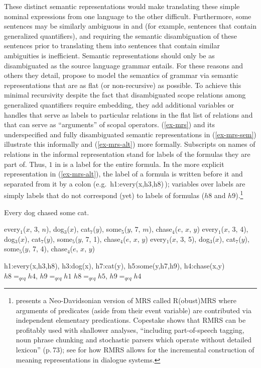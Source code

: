 \documentclass[output=paper
	        ,collection
	        ,collectionchapter
 	        ,biblatex
                ,babelshorthands
                ,newtxmath
                ,draftmode
                ,colorlinks, citecolor=brown
]{langscibook}
\begin{document}
These distinct semantic representations would make translating these simple nominal expressions from one language to the other difficult. Furthermore, some sentences may be similarly ambiguous in  and  (for example, sentences that contain generalized quantifiers), and requiring the semantic disambiguation of these sentences prior to translating them into sentences that contain similar ambiguities is inefficient. Semantic representations should only be as disambiguated as the source language grammar entails. For these reasons and others they detail, \citet{Copestakeetal1995} propose to model the semantics of grammar via semantic representations that are as flat (or non-recursive) as possible. To achieve this minimal recursivity despite the fact that disambiguated scope relations among generalized quantifiers require embedding, they add additional variables or handles that serve as labels to particular relations in the flat list of relations and that can serve as ``arguments'' of scopal operators. (\ref{ex-mrs}) and its underspecified and fully disambiguated semantic representations in (\ref{ex-mrs-sem}) illustrate this informally and (\ref{ex-mrs-alt}) more formally. Subscripts on names of relations in the informal representation stand for labels of the formulas they are part of. Thus, $1$ in  is a label for the entire formula. In the more explicit representation in (\ref{ex-mrs-alt}), the label of a formula is written before it and separated from it by a colon (e.g.\ h1:every(x,h3,h8)\,); 
variables over labels are simply labels that do not correspond (yet) to labels of formulas ($h8$ and $h9$).\footnote{\citet{Copestake2007} presents a Neo-Davidsonian version of MRS called R(obust)MRS where arguments of predicates (aside from their event variable) are contributed via independent elementary predications. Copestake shows that RMRS can be profitably used with shallower analyses, ``including part-of-speech tagging, noun phrase chunking and stochastic parsers which operate without detailed lexicon'' (p.\,73); see \citet{PeldzusandSchlangen2012} for how RMRS allows for the incremental construction of meaning representations in dialogue systems.}

\begin{exe}
\ex\label{ex-mrs}
Every dog chased some cat.
\ex\label{ex-mrs-sem}
\begin{xlist}
\ex\label{ex-mrs-sem-a}
every$_{1}$($x$, 3, $n$), dog$_{3}$($x$), cat$_{7}$($y$), some$_{5}$($y$, 7, $m$), chase$_{4}$($e$, $x$, $y$)
\ex\label{ex-mrs-sem-b}
every$_{1}$($x$, 3, 4), dog$_{3}$($x$), cat$_{7}$($y$), some$_{5}$($y$, 7, 1), chase$_{4}$($e$, $x$, $y$)
\ex\label{ex-mrs-sem-c}
every$_{1}$($x$, 3, 5), dog$_{3}$($x$), cat$_{7}$($y$), some$_{5}$($y$, 7, 4), chase$_{4}$($e$, $x$, $y$)
\end{xlist}
\ex\label{ex-mrs-alt}
\begin{xlist}
\ex\label{ex-mrs-alt-a}
h1:every(x,h3,h8), h3:dog(x), h7:cat(y), h5:some(y,h7,h9), h4:chase(x,y)
\ex\label{ex-mrs-alt-b}
$h8=_{qeq}h4$, $h9=_{qeq}h1$
\ex\label{ex-mrs-alt-c}
$h8=_{qeq}h5$, $h9=_{qeq}h4$
\end{xlist}
\end{exe} 
\end{document}

